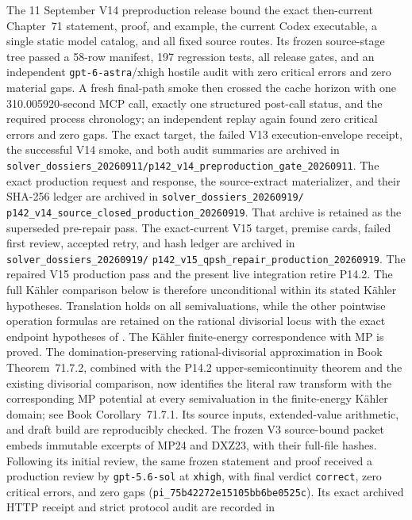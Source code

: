\documentclass[11pt,a4paper]{article}
\theoremstyle{definition}
\theoremstyle{remark}
\begin{document}
The 11 September V14 preproduction release bound the exact then-current
Chapter~71 statement, proof, and example, the current Codex executable, a
single static model catalog, and all fixed source routes.  Its frozen
source-stage tree passed a 58-row manifest, 197 regression tests, all release
gates, and an independent \texttt{gpt-6-astra}/xhigh hostile audit with zero
critical errors and zero material gaps.  A fresh final-path smoke then crossed
the cache horizon with one 310.005920-second MCP call, exactly one structured
post-call status, and the required process chronology; an independent replay
again found zero critical errors and zero gaps.  The exact target, the failed
V13 execution-envelope receipt, the successful V14 smoke, and both audit
summaries are archived in
\nolinkurl{solver_dossiers_20260911/p142_v14_preproduction_gate_20260911}.
The exact production request and response, the source-extract materializer,
and their SHA-256 ledger are archived in
\nolinkurl{solver_dossiers_20260919/}
\nolinkurl{p142_v14_source_closed_production_20260919}.
That archive is retained as the superseded pre-repair pass.  The exact-current
V15 target, premise cards, failed first review, accepted retry, and hash ledger
are archived in
\nolinkurl{solver_dossiers_20260919/}
\nolinkurl{p142_v15_qpsh_repair_production_20260919}.
The repaired V15 production pass and the present live integration retire
P14.2.  The full
K\"ahler comparison below is therefore unconditional within its stated
K\"ahler hypotheses.
Translation holds on all semivaluations, while
the other pointwise operation formulas are retained on the rational
divisorial locus with the exact endpoint hypotheses of
\cite{Xia23Operations}.  The K\"ahler finite-energy correspondence with MP
is proved.  The domination-preserving rational-divisorial approximation in
Book Theorem~71.7.2, combined with the P14.2
upper-semicontinuity theorem and the existing divisorial comparison, now
identifies the literal raw transform with the corresponding MP potential at
every semivaluation in the finite-energy K\"ahler domain; see
Book Corollary~71.7.1. Its source inputs,
extended-value arithmetic, and draft build are reproducibly checked.  The
frozen V3 source-bound packet embeds immutable excerpts of MP24 and DXZ23,
with their full-file hashes.  Following its initial review, the same frozen
statement and proof received a production review by \texttt{gpt-5.6-sol} at
\texttt{xhigh}, with final verdict \texttt{correct}, zero critical errors,
and zero gaps (\texttt{pi\_75b42272e15105bb6be0525c}).  Its exact archived
HTTP receipt and strict protocol audit are recorded in
\end{document}
